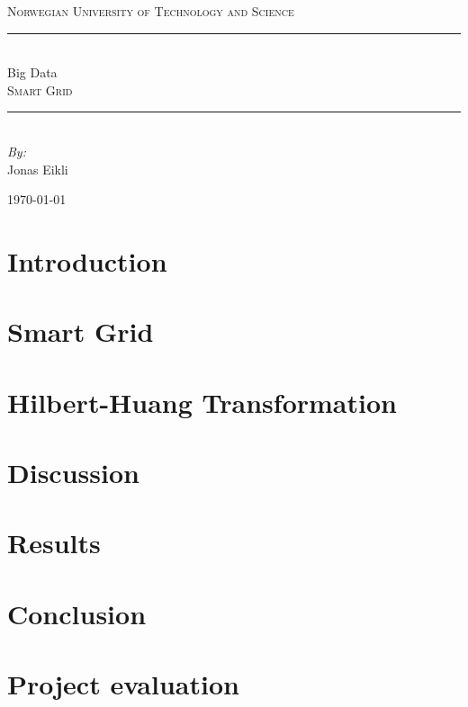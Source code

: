 \documentclass[12pt]{article}
\newcommand{\HRule}{\rule{\linewidth}{0.5mm}}
\begin{document}
\begin{titlepage}
\begin{center}
\thispagestyle{empty}

\textsc{\large Norwegian University of Technology and Science} \\

\vspace{2cm}

\HRule\\[0.5cm]
{\Huge Big Data}\\[1cm]
\textsc{\large{Smart Grid}}
\HRule\\[3.5cm]

\vspace{5cm}
{\large \emph{By:}}\\
Jonas Eikli\\

\vfill

{\large \today}


\end{center}
\end{titlepage}
\newpage


\begin{abstract}


\end{abstract}
\newpage
\tableofcontents
\newpage
\section{Introduction}

\section{Smart Grid}

\section{Hilbert-Huang Transformation}

\section{Discussion}

\section{Results}

\section{Conclusion}

\section{Project evaluation}

\newpage


\end{document}
